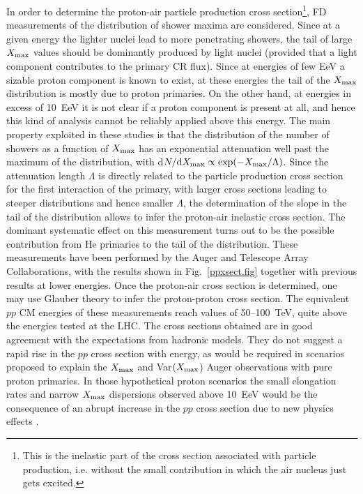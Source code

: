 \documentclass[twoside,12pt]{article}
\begin{document}
In order to determine the proton-air particle production cross section\footnote{This is the inelastic part of the cross section associated with particle production, i.e. without the small contribution in which the air nucleus just gets excited.}, FD measurements of the distribution of shower maxima are considered. Since at a given energy the lighter nuclei lead to more penetrating showers, the tail of large $X_{\rm max}$ values should be dominantly produced by light nuclei (provided that a light component contributes to the primary CR flux). Since at energies of few EeV a sizable proton component is known to exist, at these energies the tail of the $X_{\rm max}$ distribution is mostly due to proton primaries. On the other hand, at energies in excess of 10~EeV it is not clear if a proton component is present at all, and hence this kind of analysis cannot be reliably applied above this energy. The main property exploited in these studies is that the distribution of the number of showers as a function of $X_{\rm max}$ has an exponential attenuation well past the maximum of the distribution, with d$N/{\rm d}X_{\rm max}\propto \exp(-X_{\rm max}/\Lambda)$. Since the attenuation length $\Lambda$ is directly related to the particle production cross section for the first interaction of the primary, with larger cross sections leading to steeper distributions and hence smaller $\Lambda$, the determination of the slope in the tail of the distribution allows to infer the proton-air inelastic cross section. The dominant systematic effect on this measurement turns out to be the possible contribution from He primaries to the tail of the distribution. These measurements have been performed by the Auger \cite{ppxsecta} and Telescope Array \cite{ppxsectta} Collaborations, with the results shown in Fig.~\ref{ppxsect.fig} together with previous results at lower energies.  Once the proton-air cross section is determined, one may use Glauber theory to infer the proton-proton cross section. The equivalent $pp$ CM energies of these measurements reach values of 50--100~TeV, quite above the energies tested at the LHC.  The cross sections obtained  are in good agreement with the expectations from hadronic models. They do not suggest a rapid rise in the $pp$ cross section with energy, as would be required  in scenarios proposed to explain the $X_{\rm max}$ and Var$(X_{\rm max}$) Auger observations with pure proton primaries. In those hypothetical proton scenarios the small elongation rates and narrow $X_{\rm max}$ dispersions observed above 10~EeV would be the consequence of an abrupt increase in the $pp$ cross section due to new physics effects \cite{wi11}.
\end{document}
